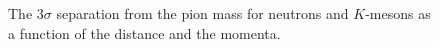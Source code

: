 \begin{figure}
\begin{center}
\end{center}
\caption{
The $3\sigma$ separation from the pion mass for neutrons and $K$-mesons as a function of the distance and the momenta.
}
\label{fig:singleparticles}
\end{figure}


